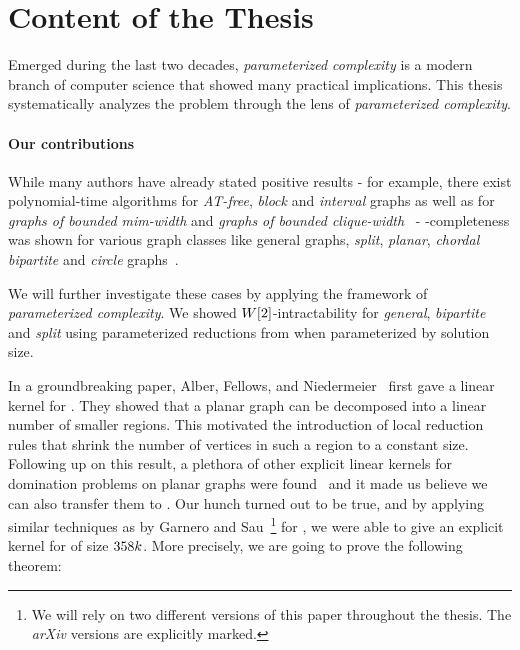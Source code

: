 \section*{Content of the Thesis}

Emerged during the last two decades, \textit{parameterized complexity} is a modern branch of computer science that showed many practical implications. 
This thesis systematically analyzes the \sdom problem through the lens of \textit{parameterized complexity}. 

\paragraph{Our contributions}

While many authors have already stated positive results - for example, there exist polynomial-time algorithms for \emph{AT-free}, \emph{block} and \emph{interval} graphs as well as for \emph{graphs of bounded mim-width} and \emph{graphs of bounded clique-width}~\cite{Kloks2021, Galby2020,Courcelle1990,Henning2022,Henning2019} - \NP-completeness was shown for various graph classes like general graphs, \emph{split}, \emph{planar}, \emph{chordal bipartite} and \emph{circle} graphs~\cite{Henning2019, Kloks2021}.


We will further investigate these \NPc cases by applying the framework of \textit{parameterized complexity}. 
We showed $W[2]$-intractability for \textit{general}, \textit{bipartite} and \textit{split} using parameterized reductions from \dom when parameterized by solution size.

In a groundbreaking paper, Alber, Fellows, and Niedermeier~\cite{Alber2004} first gave a linear kernel for \pdom. 
They showed that a planar graph can be decomposed into a linear number of smaller regions. 
This motivated the introduction of local reduction rules that shrink the number of vertices in such a region to a constant size. 
Following up on this result, a plethora of other explicit linear kernels for domination problems on planar graphs were found~\cite{Guo2007, Garnero2017, Luo2013, Alber2006} and it made us believe we can also transfer them to \psdom.
Our hunch turned out to be true, and by applying similar techniques as by Garnero and Sau~\cite{Garnero2018}\footnote{We will rely on two different versions of this paper throughout the thesis. The \textit{arXiv} versions are explicitly marked.} for \ptdom, we were able to give an explicit kernel for \psdom of size $358 k$. 
More precisely, we are going to prove the following theorem:

